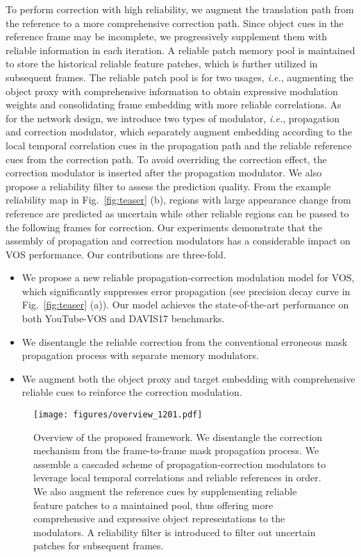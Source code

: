 \documentclass[letterpaper]{article} \usepackage{aaai22}  \usepackage{times}  \usepackage{helvet}  \usepackage{courier}  \usepackage[hyphens]{url}  \usepackage{graphicx} \urlstyle{rm} \def\UrlFont{\rm}  \usepackage{natbib}  \usepackage{caption} \DeclareCaptionStyle{ruled}{labelfont=normalfont,labelsep=colon,strut=off} \frenchspacing  \setlength{\pdfpagewidth}{8.5in}  \setlength{\pdfpageheight}{11in}  \usepackage{algorithm}
\def\ie{\textit{i.e.}}
\newcommand{\fig}[1]{Fig.~#1}
\begin{document}
To perform correction with high reliability, we augment the translation path from the reference to a more comprehensive correction path.
Since object cues in the reference frame may be incomplete, we progressively supplement them with reliable information in each iteration. A reliable patch memory pool is maintained to store the historical reliable feature patches, which is further utilized in subsequent frames. The reliable patch pool is for two usages, \ie, augmenting the object proxy with comprehensive information to obtain expressive modulation weights and consolidating frame embedding with more reliable correlations.  
As for the network design, we introduce two types of modulator, \ie, propagation and correction modulator, which separately augment embedding according to the local temporal correlation cues in the propagation path and the reliable reference cues from the correction path. To avoid overriding the correction effect, the correction modulator is inserted after the propagation modulator.
We also propose a reliability filter to assess the prediction quality. From the example reliability map in \fig{\ref{fig:teaser}} (b), regions with large appearance change from reference are predicted as uncertain while other reliable regions can be passed to the following frames for correction.
Our experiments demonstrate that the assembly of propagation and correction modulators has a considerable impact on VOS performance. 
Our contributions are three-fold. 

\begin{itemize}
    \item 
    We propose a new reliable propagation-correction modulation model for VOS, which significantly suppresses error propagation (see precision decay curve in \fig{\ref{fig:teaser}} (a)). Our model achieves the state-of-the-art performance on both YouTube-VOS and DAVIS17 benchmarks.
    \item We disentangle the reliable correction from the conventional erroneous mask propagation process with separate memory modulators.
    \item We augment both the object proxy and target embedding with comprehensive reliable cues to reinforce the correction modulation.
\end{itemize}
 
\begin{figure*}[t]
	\centering
	\texttt{[image: figures/overview\_1201.pdf]} 
	\caption{Overview of the proposed framework. We disentangle the correction mechanism from the frame-to-frame mask propagation process. 
	We assemble a cascaded scheme of propagation-correction modulators to leverage local temporal correlations and reliable references in order. We also augment the reference cues by supplementing reliable feature patches to a maintained pool, thus offering more comprehensive and expressive object representations to the modulators. A reliability filter is introduced to filter out uncertain patches for subsequent frames.
	}
	\label{fig:PIPELINE}
\end{figure*}
\end{document}

